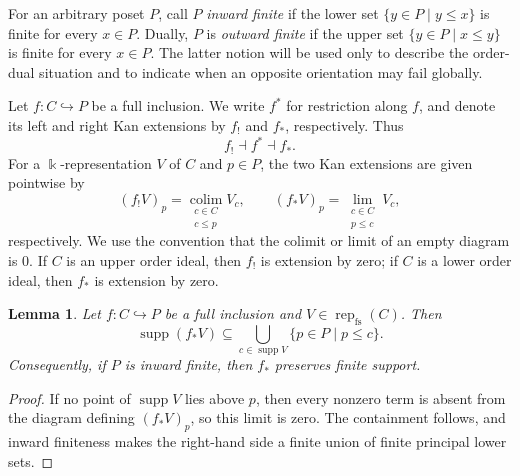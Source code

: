 \documentclass[12pt,reqno]{amsart}
\newtheorem{lemma}[theorem]{Lemma}
\theoremstyle{definition}
\theoremstyle{remark}
\newcommand{\Rep}{\operatorname{rep}}
\begin{document}
For an arbitrary poset $P$, call $P$ \emph{inward finite} if the lower set
$\{y\in P\mid y\le x\}$ is finite for every $x\in P$.  Dually, $P$ is
\emph{outward finite} if the upper set $\{y\in P\mid x\le y\}$ is finite for
every $x\in P$.  The latter notion will be used only to describe the
order-dual situation and to indicate when an opposite orientation may fail
globally.

Let $f:C\hookrightarrow P$ be a full inclusion.  We write $f^*$ for
restriction along $f$, and denote its left and right Kan extensions by
$f_!$ and $f_*$, respectively.  Thus
\[
f_!\dashv f^*\dashv f_*.
\]
For a $\Bbbk$-representation $V$ of $C$ and $p\in P$, the two Kan extensions are
given pointwise by
\[
(f_!V)_p=\operatorname*{colim}_{\substack{c\in C\\c\le p}}V_c,
\qquad
(f_*V)_p=\operatorname*{lim}_{\substack{c\in C\\p\le c}}V_c,
\]
respectively.  We use the convention that the colimit or limit of an empty
diagram is $0$.  If $C$ is an upper order ideal, then $f_!$ is extension by
zero; if $C$ is a lower order ideal, then $f_*$ is extension by zero.

\begin{lemma}\label{lem:fs-kan-support}
Let $f:C\hookrightarrow P$ be a full inclusion and
$V\in\Rep_{\mathrm{fs}}(C)$.  Then
\[
\operatorname{supp}(f_*V)
\subseteq\bigcup_{c\in\operatorname{supp}V}\{p\in P\mid p\le c\}.
\]
Consequently, if $P$ is inward finite, then $f_*$ preserves finite support.
\end{lemma}

\begin{proof}
If no point of $\operatorname{supp}V$ lies above $p$, then every nonzero term
is absent from the diagram defining $(f_*V)_p$, so this limit is zero.  The
containment follows, and inward finiteness makes the right-hand side a finite
union of finite principal lower sets.
\end{proof}
\end{document}
